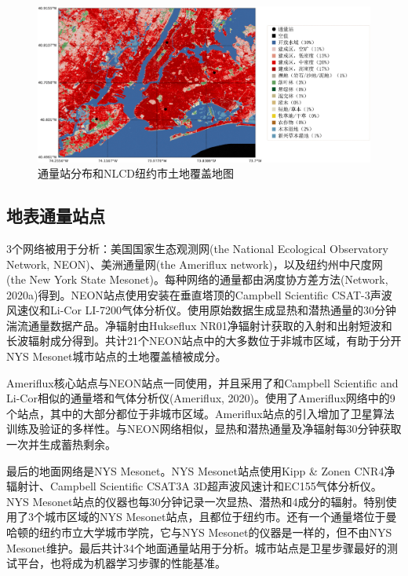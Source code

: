 \documentclass[3p,times]{elsarticle}
\begin{document}
\begin{figure}[htbp]
    \begin{center}
        \includegraphics[width=\linewidth]{img/图2.png}
    \end{center}
    \caption{通量站分布和NLCD纽约市土地覆盖地图}
\end{figure}

\subsection{地表通量站点}

3个网络被用于分析：美国国家生态观测网(the National Ecological Observatory Network, NEON)、美洲通量网(the Ameriflux network)，以及纽约州中尺度网(the New York State Mesonet)。每种网络的通量都由涡度协方差方法(Network, 2020a)得到。NEON站点使用安装在垂直塔顶的Campbell Scientific CSAT-3声波风速仪和Li-Cor LI-7200气体分析仪。使用原始数据生成显热和潜热通量的30分钟湍流通量数据产品。净辐射由Hukseflux NR01净辐射计获取的入射和出射短波和长波辐射成分得到。共计21个NEON站点中的大多数位于非城市区域，有助于分开NYS Mesonet城市站点的土地覆盖植被成分。

Ameriflux核心站点与NEON站点一同使用，并且采用了和Campbell Scientific and Li-Cor相似的通量塔和气体分析仪(Ameriflux, 2020)。使用了Ameriflux网络中的9个站点，其中的大部分都位于非城市区域。Ameriflux站点的引入增加了卫星算法训练及验证的多样性。与NEON网络相似，显热和潜热通量及净辐射每30分钟获取一次并生成蓄热剩余。

最后的地面网络是NYS Mesonet。NYS Mesonet站点使用Kipp \& Zonen CNR4净辐射计、Campbell Scientific CSAT3A 3D超声波风速计和EC155气体分析仪。NYS Mesonet站点的仪器也每30分钟记录一次显热、潜热和4成分的辐射。特别使用了3个城市区域的NYS Mesonet站点，且都位于纽约市。还有一个通量塔位于曼哈顿的纽约市立大学城市学院，它与NYS Mesonet的仪器是一样的，但不由NYS Mesonet维护。最后共计34个地面通量站用于分析。城市站点是卫星步骤最好的测试平台，也将成为机器学习步骤的性能基准。
\end{document}

